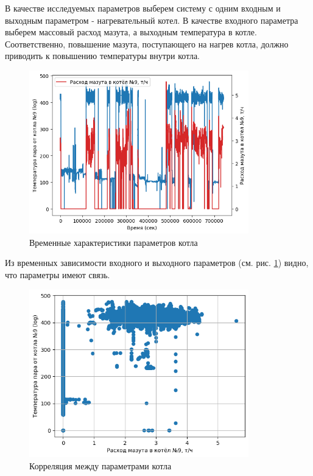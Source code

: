 В качестве исследуемых параметров выберем систему с одним входным и выходным
параметром - нагревательный котел. В качестве входного параметра выберем
массовый расход мазута, а выходным температура в котле. Соответственно,
повышение мазута, поступающего на нагрев котла, должно приводить к повышению
температуры внутри котла. 

\begin{figure}[H]
  \centering
    \includegraphics[width=0.85\textwidth]{figures/plots/kotel_temp_mazut.png}
  \caption{Временные характеристики параметров котла}\label{fig:plt:kotel}
\end{figure}

Из временных зависимости входного и выходного параметров (см. рис.
\ref{fig:plt:kotel}) видно, что параметры имеют связь. 

\begin{figure}[H]
  \begin{center}
    \includegraphics[width=0.85\textwidth]{figures/plots/kotel_temp_mazut_rel.png}
  \end{center}
  \caption{Корреляция между параметрами котла}\label{fig:plt:kotel:rel}
\end{figure}

